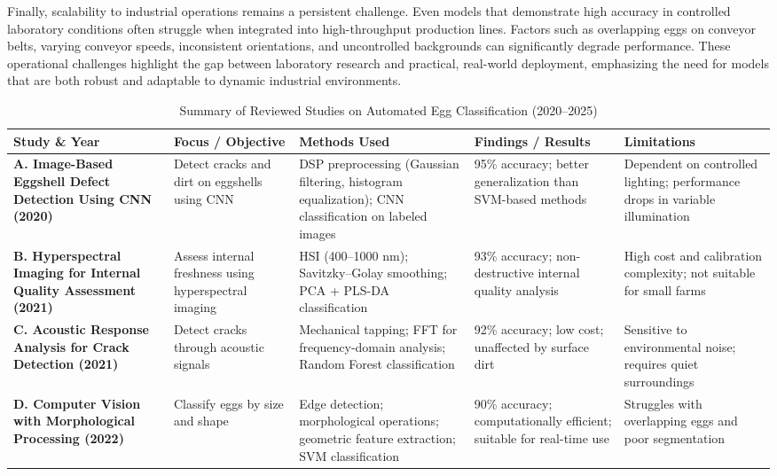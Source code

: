 \documentclass[conference]{IEEEtran}
\begin{document}
	Finally, scalability to industrial operations remains a persistent challenge. Even models that demonstrate high accuracy in controlled laboratory conditions often struggle when integrated into high-throughput production lines. Factors such as overlapping eggs on conveyor belts, varying conveyor speeds, inconsistent orientations, and uncontrolled backgrounds can significantly degrade performance. These operational challenges highlight the gap between laboratory research and practical, real-world deployment, emphasizing the need for models that are both robust and adaptable to dynamic industrial environments. \\
	
	\begin{table*}[htbp]
		\centering
		\caption{Summary of Reviewed Studies on Automated Egg Classification (2020–2025)}
		\label{tab:reviewed_studies}
		\begin{tabular}{|p{3cm}|p{3cm}|p{3cm}|p{3cm}|p{3cm}|}
			\hline
			\textbf{Study \& Year} & \textbf{Focus / Objective} & \textbf{Methods Used} & \textbf{Findings / Results} & \textbf{Limitations} \\
			\hline
			\textbf{A. Image-Based Eggshell Defect Detection Using CNN (2020)} & Detect cracks and dirt on eggshells using CNN & DSP preprocessing (Gaussian filtering, histogram equalization); CNN classification on labeled images & 95\% accuracy; better generalization than SVM-based methods & Dependent on controlled lighting; performance drops in variable illumination \\
			\hline
			\textbf{B. Hyperspectral Imaging for Internal Quality Assessment (2021)} & Assess internal freshness using hyperspectral imaging & HSI (400–1000 nm); Savitzky–Golay smoothing; PCA + PLS-DA classification & 93\% accuracy; non-destructive internal quality analysis & High cost and calibration complexity; not suitable for small farms \\
			\hline
			\textbf{C. Acoustic Response Analysis for Crack Detection (2021)} & Detect cracks through acoustic signals & Mechanical tapping; FFT for frequency-domain analysis; Random Forest classification & 92\% accuracy; low cost; unaffected by surface dirt & Sensitive to environmental noise; requires quiet surroundings \\
			\hline
			\textbf{D. Computer Vision with Morphological Processing (2022)} & Classify eggs by size and shape & Edge detection; morphological operations; geometric feature extraction; SVM classification & 90\% accuracy; computationally efficient; suitable for real-time use & Struggles with overlapping eggs and poor segmentation \\

\end{tabular}
\end{table*}
\end{document}
